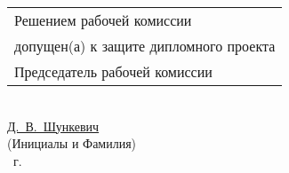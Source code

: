 {
\begin{minipage}{\textwidth}
    \vspace{20cm}
    \begin{flushleft}
        \begin{tabular}{@{}l@{}}
            Решением рабочей комиссии\\
            допущен(а) к защите дипломного проекта\\[0.5em]
            Председатель рабочей комиссии
        \end{tabular}\\[0.7em]
        \uline{\hspace{7em}} \uline{Д.~В.~Шункевич\hspace{5em}}\\
        \hspace*{2em}{\footnotesize(Подпись)} \hspace*{1.5em} {\footnotesize(Инициалы и Фамилия)}\\
        \underline{\hspace*{2em}} \underline{\hspace*{6.5em}} \the\year{}~г.
    \end{flushleft}
\end{minipage}\\[1em]
}